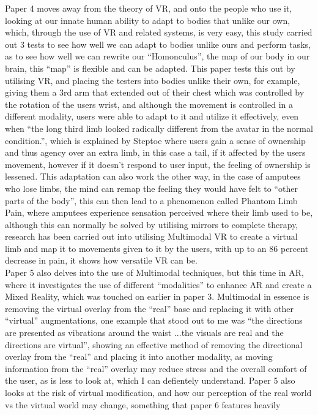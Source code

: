 \documentclass{scrartcl}
\begin{document}
Paper 4\cite{won2015homuncular} moves away from the theory of VR, and onto the people who use it, looking at our innate human ability to adapt to bodies that unlike our own, which, through the use of VR and related systems, is very easy, this study carried out 3 tests to see how well we can adapt to bodies unlike ours and perform tasks, as to see how well we can rewrite our ``Homonculus'', the map of our body in our brain, this ``map'' is flexible and can be adapted. This paper tests this out by utilising VR, and placing the testers into bodies unlike their own, for example, giving them a 3rd arm that extended out of their chest which was controlled by the rotation of the users wrist, and although the movement is controlled in a different modality, users were able to adapt to it and utilize it effectively, even when ``the long third limb looked radically different from the avatar in the normal condition.''\cite{won2015homuncular}, which is explained by Steptoe\cite{steptoe2013human} where users gain a sense of ownership and thus agency over an extra limb, in this case a tail, if it affected by the users movement, however if it doesn't respond to user input, the feeling of ownership is lessened. This adaptation can also work the other way, in the case of amputees who lose limbs, the mind can remap the feeling they would have felt to ``other parts of the body''\cite{won2015homuncular}, this can then lead to a phenomenon called Phantom Limb Pain, where amputees experience sensation perceived where their limb used to be, although this can normally be solved by utilising mirrors to complete therapy, research has been carried out into utilising Multimodal VR to create a virtual limb and map it to movements given to it by the users, with up to an 86 percent decrease in pain\cite{wake2015multimodal}, it shows how versatile VR can be.\\

Paper 5 \cite{rosa2016re} also delves into the use of Multimodal techniques, but this time in AR, where it investigates the use of different ``modalities'' to enhance AR and create a Mixed Reality, which was touched on earlier in paper 3. Multimodal in essence is removing the virtual overlay from the ``real'' base and replacing it with other ``virtual'' augmentations, one example that stood out to me was ``the directions are presented as vibrations around the waist ...the visuals are real and the directions are virtual''\cite{rosa2016re}, showing an effective method of removing the directional overlay from the ``real'' and placing it into another modality, as moving information from the ``real'' overlay may reduce stress and the overall comfort of the user, as is less to look at, which I can defientely understand. Paper 5 also looks at the risk of virtual modification, and how our perception of the real world vs the virtual world may change, something that paper 6\cite{madary2016real} features heavily







\noindent 




\raggedright


\end{document}
